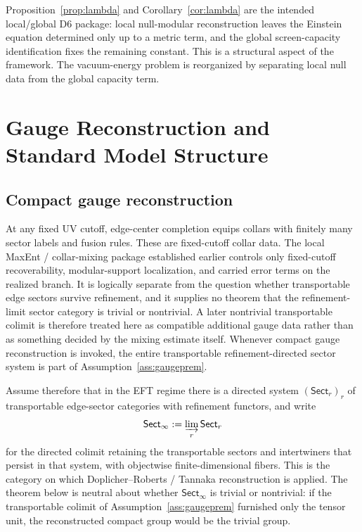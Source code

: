 \documentclass[11pt]{article}
\begin{document}
Proposition~\ref{prop:lambda} and Corollary~\ref{cor:lambda} are the intended local/global D6 package: local null-modular reconstruction leaves the Einstein equation determined only up to a metric term, and the global screen-capacity identification fixes the remaining constant. This is a structural aspect of the framework. The vacuum-energy problem is reorganized by separating local null data from the global capacity term.

\section{Gauge Reconstruction and Standard Model Structure}

\subsection{Compact gauge reconstruction}

At any fixed UV cutoff, edge-center completion equips collars with finitely many sector labels and fusion rules. These are fixed-cutoff collar data. The local MaxEnt / collar-mixing package established earlier controls only fixed-cutoff recoverability, modular-support localization, and carried error terms on the realized branch. It is logically separate from the question whether transportable edge sectors survive refinement, and it supplies no theorem that the refinement-limit sector category is trivial or nontrivial. A later nontrivial transportable colimit is therefore treated here as compatible additional gauge data rather than as something decided by the mixing estimate itself. Whenever compact gauge reconstruction is invoked, the entire transportable refinement-directed sector system is part of Assumption~\ref{ass:gaugeprem}.

Assume therefore that in the EFT regime there is a directed system \((\mathsf{Sect}_r)_r\) of transportable edge-sector categories with refinement functors, and write
\[
\mathsf{Sect}_\infty := \varinjlim_r \mathsf{Sect}_r
\]
for the directed colimit retaining the transportable sectors and intertwiners that persist in that system, with objectwise finite-dimensional fibers. This is the category on which Doplicher--Roberts / Tannaka reconstruction is applied. The theorem below is neutral about whether \(\mathsf{Sect}_\infty\) is trivial or nontrivial: if the transportable colimit of Assumption~\ref{ass:gaugeprem} furnished only the tensor unit, the reconstructed compact group would be the trivial group.
\end{document}
